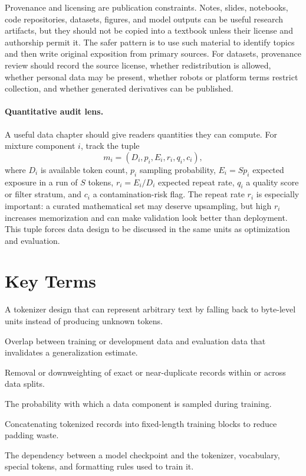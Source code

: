 Provenance and licensing are publication constraints. Notes, slides, notebooks, code repositories, datasets, figures, and model outputs can be useful research artifacts, but they should not be copied into a textbook unless their license and authorship permit it. The safer pattern is to use such material to identify topics and then write original exposition from primary sources. For datasets, provenance review should record the source license, whether redistribution is allowed, whether personal data may be present, whether robots or platform terms restrict collection, and whether generated derivatives can be published.

\paragraph{Quantitative audit lens.}
A useful data chapter should give readers quantities they can compute. For mixture component $i$, track the tuple
\begin{equation}
  m_i = (D_i, p_i, E_i, r_i, q_i, c_i),
\end{equation}
where $D_i$ is available token count, $p_i$ sampling probability, $E_i=Sp_i$ expected exposure in a run of $S$ tokens, $r_i=E_i/D_i$ expected repeat rate, $q_i$ a quality score or filter stratum, and $c_i$ a contamination-risk flag. The repeat rate $r_i$ is especially important: a curated mathematical set may deserve upsampling, but high $r_i$ increases memorization and can make validation look better than deployment. This tuple forces data design to be discussed in the same units as optimization and evaluation.

\section{Key Terms}
\label{sec:chapter-two-key-terms}

\begin{description}[Decontamination]
\item[Byte fallback] A tokenizer design that can represent arbitrary text by falling back to byte-level units instead of producing unknown tokens.
\item[Contamination] Overlap between training or development data and evaluation data that invalidates a generalization estimate.
\item[Deduplication] Removal or downweighting of exact or near-duplicate records within or across data splits.
\item[Mixture weight] The probability with which a data component is sampled during training.
\item[Sequence packing] Concatenating tokenized records into fixed-length training blocks to reduce padding waste.
\item[Tokenizer-model coupling] The dependency between a model checkpoint and the tokenizer, vocabulary, special tokens, and formatting rules used to train it.
\end{description}

